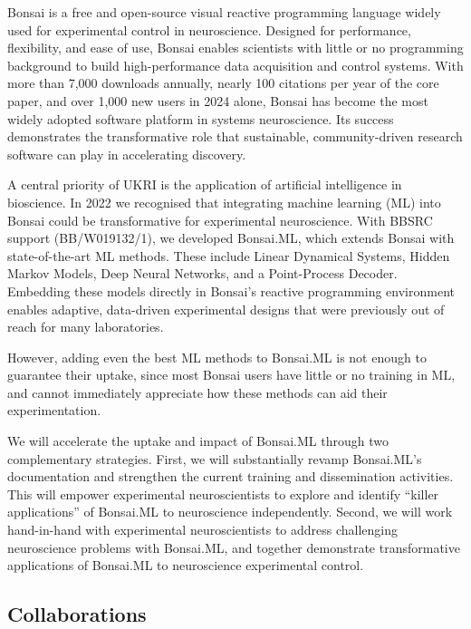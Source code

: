 
Bonsai is a free and open-source visual reactive programming language widely
used for experimental control in neuroscience. Designed for performance,
flexibility, and ease of use, Bonsai enables scientists with little or no
programming background to build high-performance data acquisition and control
systems. With more than 7,000 downloads annually, nearly 100 citations per year
of the core paper, and over 1,000 new users in 2024 alone, Bonsai has become
the most widely adopted software platform in systems neuroscience. Its success
demonstrates the transformative role that sustainable, community-driven
research software can play in accelerating discovery.


A central priority of UKRI is the application of artificial intelligence in
bioscience. In 2022 we recognised that integrating machine learning (ML) into
Bonsai could be transformative for experimental neuroscience. With BBSRC
support (BB/W019132/1), we developed Bonsai.ML, which extends Bonsai with
state-of-the-art ML methods. These include Linear Dynamical Systems, Hidden
Markov Models, Deep Neural Networks, and a Point-Process Decoder. Embedding
these models directly in Bonsai's reactive programming environment enables
adaptive, data-driven experimental designs that were previously out of reach
for many laboratories.


However, adding even the best ML methods to Bonsai.ML is not enough to guarantee
their uptake, since most Bonsai users have little or no training in ML, and
cannot immediately appreciate how these methods can aid their experimentation.
%
%


We will accelerate the uptake and impact of Bonsai.ML through two complementary
strategies.
%
First, we will substantially revamp Bonsai.ML's documentation and strengthen
the current training and dissemination activities. This will empower
experimental neuroscientists to explore and identify ``killer applications''
of Bonsai.ML to neuroscience independently.
%
Second, we will work hand-in-hand with experimental neuroscientists to address
challenging neuroscience problems with Bonsai.ML, and together demonstrate
transformative applications of Bonsai.ML to neuroscience experimental control.

\subsection{Collaborations}


